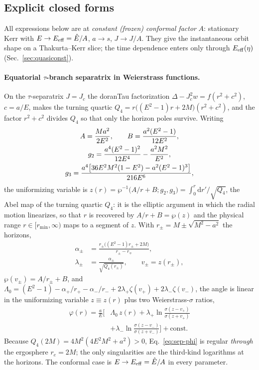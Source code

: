 \documentclass[12pt]{iopart}
\newcommand{\Ehat}{\hat E}
\newcommand{\re}{r_{e}}
\newcommand{\Jc}{J_{c}}
\newcommand{\dd}{\mathrm{d}}
\begin{document}
\subsection{Explicit closed forms}
\label{app:explicit}

All expressions below are at \emph{constant (frozen) conformal factor} $A$:
stationary Kerr with $E\to E_{\rm eff}=\Ehat/A$, $a\to s$, $J\to J/A$. They give
the instantaneous orbit shape on a Thakurta--Kerr slice; the time dependence
enters only through $E_{\rm eff}(\eta)$ (Sec.~\ref{sec:quasiconst}).

\paragraph{Equatorial $\tau$-branch separatrix in Weierstrass functions.} On the
$\tau$-separatrix $J=\Jc$ the doranTau factorization $\Delta-\Jc^2 w=f(r^2+c^2)$,
$c=a/E$, makes the
turning quartic $Q_4=r\big((E^2-1)r+2M\big)(r^2+c^2)$, and the factor $r^2+c^2$
divides $Q_4$ so that only the horizon poles survive. Writing
\begin{gather}
    A=\frac{Ma^2}{2E^2},\qquad B=\frac{a^2(E^2-1)}{12E^2},\notag\\
    g_2=\frac{a^4(E^2-1)^2}{12E^4}-\frac{a^2M^2}{E^2},\notag\\
    g_3=\frac{a^4\big[36E^2M^2(1-E^2)-a^2(E^2-1)^3\big]}{216E^6},
    \label{eq:wp-invariants}
\end{gather}
the uniformizing variable is $z(r)=\wp^{-1}\!\big(A/r+B;g_2,g_3\big)
=\int_0^r\dd r'/\sqrt{Q_4}$, the Abel map of the turning quartic $Q_4$: it is the
elliptic argument in which the radial motion linearizes, so that $r$ is recovered
by $A/r+B=\wp(z)$ and the physical range $r\in[r_{\min},\infty)$ maps to a
segment of $z$. With $r_\pm=M\pm\sqrt{M^2-a^2}$ the horizons,
\begin{equation}
\begin{aligned}
    \alpha_\pm&=\frac{r_\pm\big((E^2-1)r_\pm+2M\big)}{r_\pm-r_\mp},\\
    \lambda_\pm&=\frac{\alpha_\pm}{\sqrt{Q_4(r_\pm)}},\qquad v_\pm=z(r_\pm),
\end{aligned}
\end{equation}
$\wp(v_\pm)=A/r_\pm+B$, and
$\Lambda_0=(E^2-1)-\alpha_+/r_+-\alpha_-/r_-+2\lambda_+\zeta(v_+)+2\lambda_-\zeta(v_-)$,
the angle is linear in the uniformizing variable $z\equiv z(r)$ plus two
Weierstrass-$\sigma$ ratios,
\begin{equation}
\begin{split}
    \varphi(r)=\frac{a}{E}\Big[&\Lambda_0\,z(r)
      +\lambda_+\ln\frac{\sigma(z-v_+)}{\sigma(z+v_+)}\\
      &+\lambda_-\ln\frac{\sigma(z-v_-)}{\sigma(z+v_-)}\Big]+\text{const}.
\end{split}
    \label{eq:sep-phi}
\end{equation}
Because $Q_4(2M)=4M^2(4E^2M^2+a^2)>0$, Eq.~\eqref{eq:sep-phi} is regular
\emph{through} the ergosphere $\re=2M$; the only singularities are the
third-kind logarithms at the horizons. The conformal case is
$E\to E_{\rm eff}=\Ehat/A$ in every parameter.
\end{document}
